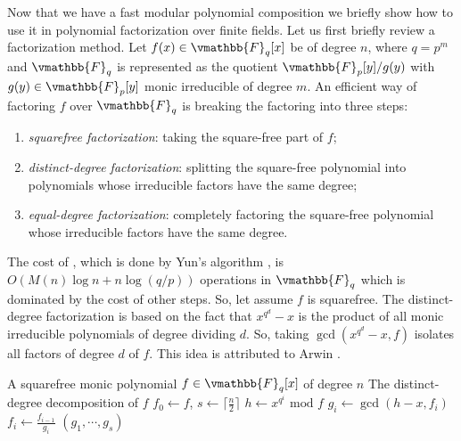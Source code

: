 Now that we have a fast modular polynomial composition we briefly show how to use it in polynomial 
factorization over finite fields. Let us first briefly review a factorization method. Let $f(x) \in 
\vmathbb{F}_q[x]$ be of degree $n$, where $q = p^m$ and $\vmathbb{F}_q$ is represented as the quotient 
$\vmathbb{F}_p[y]/g(y)$ with $g(y) \in \vmathbb{F}_p[y]$ monic irreducible of degree $m$. An efficient 
way of factoring $f$ over $\vmathbb{F}_q$ is breaking the factoring into three steps:
\begin{enumerate}
\item \emph{squarefree factorization}: taking the square-free part of $f$;
\label{item:sqf-factor}
\item \emph{distinct-degree factorization}: splitting the square-free polynomial into polynomials 
whose irreducible factors have the same degree;
\item \emph{equal-degree factorization}: completely factoring the square-free polynomial whose 
irreducible factors have the same degree.
\end{enumerate}
The cost of , which is done by Yun's algorithm \cite{Yun1976}, is 
$O(M(n)\log n + n\log (q / p))$ operations in $\vmathbb{F}_q$ which is dominated by the cost of other 
steps. So, let assume $f$ is squarefree. The distinct-degree factorization is based on the fact that 
$x^{q^d} - x$ is the product of all monic irreducible polynomials of degree dividing $d$. So, taking 
$\gcd(x^{q^d} - x, f)$ isolates all factors of degree $d$ of $f$. This idea is attributed to Arwin 
\cite{Arwin1918}.

\begin{algorithm}
\label{algorithm:DDF}
\begin{algorithmic}[1]
\REQUIRE A squarefree monic polynomial $f \in \vmathbb{F}_q[x]$ of degree $n$
\ENSURE The distinct-degree decomposition of $f$
\STATE $f_0 \leftarrow f$, $s \leftarrow \lceil \frac{n}{2} \rceil$
	\STATE $h \leftarrow x^{q^i} \text{ mod } f$
	\STATE $g_i \leftarrow \gcd(h - x, f_i)$
	\STATE $f_i \leftarrow \frac{f_{i - 1}}{g_i}$
\ENDFOR
\RETURN $(g_1, \cdots, g_s)$
\end{algorithmic}
\end{algorithm}

